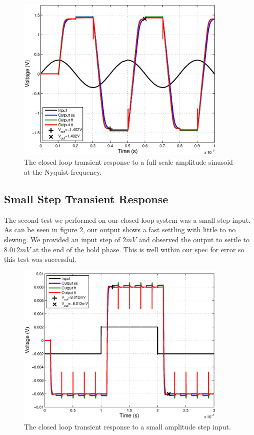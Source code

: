 \documentclass[journal]{IEEEtran}
\begin{document}
\begin{figure}
\centering
\includegraphics[width=4in]{Plots/closed_sine.eps}
\caption{The closed loop transient response to a full-scale amplitude sinusoid at the Nyquist frequency.}
\label{fig:closed_sine}
\end{figure}


\subsection{Small Step Transient Response}
The second test we performed on our closed loop system was a small step input. As can be seen in figure \ref{fig:closed_small_step}, our output shows a fast settling with little to no slewing. We provided an input step of $2mV$ and observed the output to settle to $8.012mV$ at the end of the hold phase. This is well within our spec for error so this test was successful.

\begin{figure}
\centering
\includegraphics[width=4in]{Plots/closed_small_step.eps}
\caption{The closed loop transient response to a small amplitude step input.}
\label{fig:closed_small_step}
\end{figure}
\end{document}
